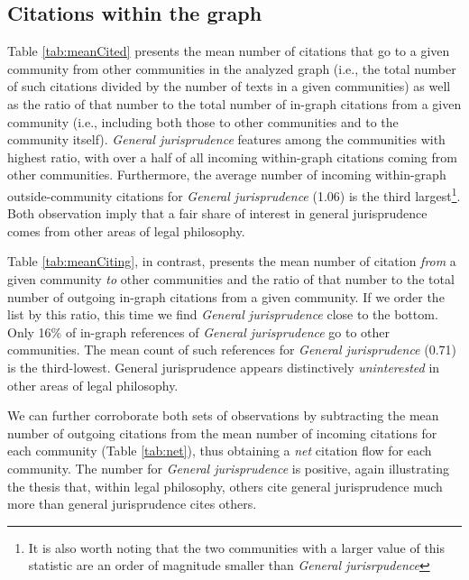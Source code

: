 \documentclass[
]{article}
\begin{document}
\hypertarget{citations-within-the-graph}{%
\subsection{Citations within the graph}\label{citations-within-the-graph}}

Table \ref{tab:meanCited} presents the mean number of citations that go to a given community from other communities in the analyzed graph (i.e., the total number of such citations divided by the number of texts in a given communities) as well as the ratio of that number to the total number of in-graph citations from a given community (i.e., including both those to other communities and to the community itself). \emph{General jurisprudence} features among the communities with highest ratio, with over a half of all incoming within-graph citations coming from other communities. Furthermore, the average number of incoming within-graph outside-community citations for \emph{General jurisprudence} (1.06) is the third largest\footnote{It is also worth noting that the two communities with a larger value of this statistic are an order of magnitude smaller than \emph{General jurisrpudence}}. Both observation imply that a fair share of interest in general jurisprudence comes from other areas of legal philosophy.

Table \ref{tab:meanCiting}, in contrast, presents the mean number of citation \emph{from} a given community \emph{to} other communities and the ratio of that number to the total number of outgoing in-graph citations from a given community. If we order the list by this ratio, this time we find \emph{General jurisprudence} close to the bottom. Only 16\% of in-graph references of \emph{General jurisprudence} go to other communities. The mean count of such references for \emph{General jurisprudence} (0.71) is the third-lowest. General jurisprudence appears distinctively \emph{uninterested} in other areas of legal philosophy.

We can further corroborate both sets of observations by subtracting the mean number of outgoing citations from the mean number of incoming citations for each community (Table \ref{tab:net}), thus obtaining a \emph{net} citation flow for each community. The number for \emph{General jurisprudence} is positive, again illustrating the thesis that, within legal philosophy, others cite general jurisprudence much more than general jurisprudence cites others.
\end{document}
